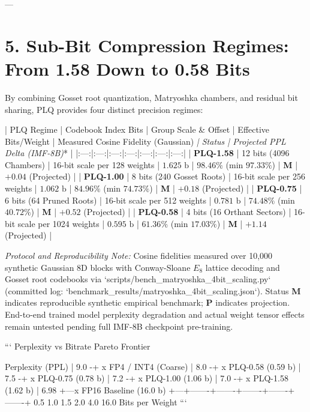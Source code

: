 \documentclass[11pt,twoside,openright]{amsbook}
\begin{document}
{{{{{---

\section{5. Sub-Bit Compression Regimes: From 1.58 Down to 0.58 Bits}

By combining Gosset root quantization, Matryoshka chambers, and residual bit sharing, PLQ provides four distinct precision regimes:

| PLQ Regime | Codebook Index Bits | Group Scale & Offset | Effective Bits/Weight | Measured Cosine Fidelity (Gaussian)\textit{ | Status | Projected PPL Delta (IMF-8B)}* |
|:---:|:---:|:---:|:---:|:---:|:---:|:---:|
| \textbf{PLQ-1.58} | 12 bits (4096 Chambers) | 16-bit scale per 128 weights | \textbf{$1.625\text{ b}$} | \textbf{$98.46\%$} (min $97.33\%$) | \textbf{M} | $+0.04$ (Projected) |
| \textbf{PLQ-1.00} | 8 bits (240 Gosset Roots) | 16-bit scale per 256 weights | \textbf{$1.062\text{ b}$} | \textbf{$84.96\%$} (min $74.73\%$) | \textbf{M} | $+0.18$ (Projected) |
| \textbf{PLQ-0.75} | 6 bits (64 Pruned Roots) | 16-bit scale per 512 weights | \textbf{$0.781\text{ b}$} | \textbf{$74.48\%$} (min $40.72\%$) | \textbf{M} | $+0.52$ (Projected) |
| \textbf{PLQ-0.58} | 4 bits (16 Orthant Sectors) | 16-bit scale per 1024 weights | \textbf{$0.595\text{ b}$} | \textbf{$61.36\%$} (min $17.03\%$) | \textbf{M} | $+1.14$ (Projected) |

\textit{Protocol and Reproducibility Note:} Cosine fidelities measured over 10,000 synthetic Gaussian 8D blocks with Conway-Sloane $E_8$ lattice decoding and Gosset root codebooks via `scripts/bench_matryoshka_4bit_scaling.py` (committed log: `benchmark_results/matryoshka_4bit_scaling.json`). Status \textbf{M} indicates reproducible synthetic empirical benchmark; \textbf{P} indicates projection.
\textit{}End-to-end trained model perplexity degradation and actual weight tensor effects remain untested pending full IMF-8B checkpoint pre-training.

```
                       Perplexity vs Bitrate Pareto Frontier
                                       
              Perplexity (PPL)
                     |
                9.0 -+                                      x FP4 / INT4 (Coarse)
                     |
                8.0 -+                        x PLQ-0.58 (0.59 b)
                     |
                7.5 -+            x PLQ-0.75 (0.78 b)
                     |
                7.2 -+      x PLQ-1.00 (1.06 b)
                     |
                7.0 -+   x PLQ-1.58 (1.62 b)
                     |
                6.98 +---x FP16 Baseline (16.0 b)
                     +---+-------+-------+-------+-------+-------+
                         0.5    1.0     1.5     2.0     4.0    16.0
                                    Bits per Weight
```

}}}}}
\end{document}
